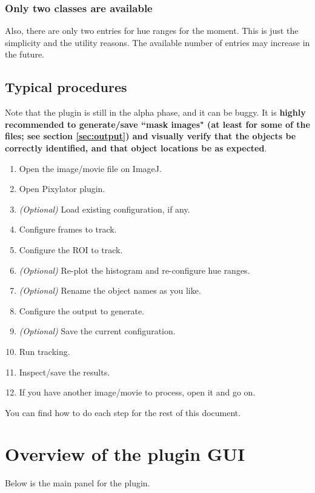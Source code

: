 \documentclass[a4paper,oneside,10pt]{article}
\begin{document}
\subsubsection{Only two classes are available}
Also, there are only two entries for hue ranges for the moment. This is just the simplicity and the utility reasons. The available number of entries may increase in the future.


\subsection{Typical procedures}
Note that the plugin is still in the alpha phase, and it can be buggy. It is {\bf highly recommended to generate/save ``mask images" (at least for some of the files; see section \ref{sec:output})  and visually verify that the objects be correctly identified, and that object locations be as expected}.

\begin{enumerate}
\item Open the image/movie file on ImageJ.
\item Open Pixylator plugin.
\item {\it (Optional)} Load existing configuration, if any.
\item Configure frames to track.
\item Configure the ROI to track.
\item {\it (Optional)} Re-plot the histogram and re-configure hue ranges.
\item {\it (Optional)} Rename the object names as you like.
\item Configure the output to generate.
\item {\it (Optional)} Save the current configuration.
\item Run tracking.
\item Inspect/save the results.
\item If you have another image/movie to process, open it and go on.
\end{enumerate}

You can find how to do each step for the rest of this document.





\section{Overview of the plugin GUI}
Below is the main panel for the plugin.
\end{document}
